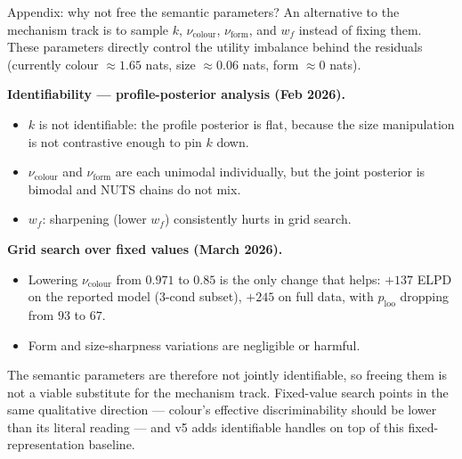 \documentclass[10pt,aspectratio=169]{beamer}
\newcommand{\main}[1]{\textcolor{CSP-main-dark}{\textbf{#1}}}
\begin{document}
\begin{frame}{Appendix: why not free the semantic parameters?}
\small
An alternative to the mechanism track is to sample $k$, $\nu_\text{colour}$, $\nu_\text{form}$, and $w_f$ instead of fixing them. These parameters directly control the utility imbalance behind the residuals (currently colour $\approx 1.65$ nats, size $\approx 0.06$ nats, form $\approx 0$ nats).

\vspace{0.4em}
\main{Identifiability --- profile-posterior analysis (Feb 2026).}
\begin{itemize}\itemsep0.1em
  \item $k$ is not identifiable: the profile posterior is flat, because the size manipulation is not contrastive enough to pin $k$ down.
  \item $\nu_\text{colour}$ and $\nu_\text{form}$ are each unimodal individually, but the joint posterior is bimodal and NUTS chains do not mix.
  \item $w_f$: sharpening (lower $w_f$) consistently hurts in grid search.
\end{itemize}

\vspace{0.4em}
\main{Grid search over fixed values (March 2026).}
\begin{itemize}\itemsep0.1em
  \item Lowering $\nu_\text{colour}$ from $0.971$ to $0.85$ is the only change that helps: $+137$ ELPD on the reported model (3-cond subset), $+245$ on full data, with $p_\text{loo}$ dropping from $93$ to $67$.
  \item Form and size-sharpness variations are negligible or harmful.
\end{itemize}

\vspace{0.4em}
The semantic parameters are therefore not jointly identifiable, so freeing them is not a viable substitute for the mechanism track. Fixed-value search points in the same qualitative direction --- colour's effective discriminability should be lower than its literal reading --- and v5 adds identifiable handles on top of this fixed-representation baseline.
\end{frame}
\end{document}
